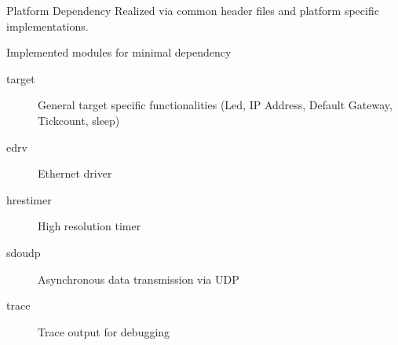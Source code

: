 \begin{frame}{Platform Dependency}
    Realized via common header files and platform specific implementations.
    \newline
    
    
    \begin{block}{Implemented modules for minimal dependency}
        \begin{description}
            \item[target] General target specific functionalities (Led, IP Address, Default Gateway, Tickcount, sleep)
            \item[edrv] Ethernet driver
            \item[hrestimer] High resolution timer
            \item[sdoudp] Asynchronous data transmission via UDP
            \item[trace] Trace output for debugging
        \end{description}
    \end{block}
\end{frame}

